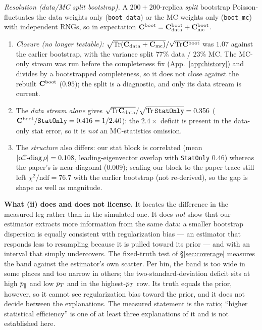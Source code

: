 \emph{Resolution (data/MC split bootstrap).} A $200{+}200$-replica \emph{split} bootstrap Poisson-fluctuates the data weights only (\texttt{boot\_data}) or the MC weights only (\texttt{boot\_mc}) with independent RNGs, so in expectation $\mathbf{C}^{\text{boot}}=\mathbf{C}^{\text{boot}}_{\mathrm{data}}+\mathbf{C}^{\text{boot}}_{\mathrm{mc}}$.
\begin{enumerate}[label=(\roman*),nosep]
\item \emph{Closure (no longer testable):} $\sqrt{\mathrm{Tr}(\mathbf{C}_{\mathrm{data}}+\mathbf{C}_{\mathrm{mc}})}/ \sqrt{\mathrm{Tr}\mathbf{C}^{\text{boot}}}$ was $1.07$ against the earlier bootstrap, with the variance split $77\%$ data / $23\%$ MC. The MC-only stream was run before the completeness fix (App.~\ref{app:history}) and divides by a bootstrapped completeness, so it does not close against the rebuilt $\mathbf{C}^{\text{boot}}$ ($0.95$); the split is a diagnostic, and only its data stream is current.
\item The \emph{data stream alone} gives $\sqrt{\mathrm{Tr}\mathbf{C}_{\mathrm{data}}}/\sqrt{\mathrm{Tr}\,\texttt{StatOnly}}=0.356$ ($\mathbf{C}^{\text{boot}}/\texttt{StatOnly}=0.416=1/2.40$): the $2.4\times$ deficit is present in the data-only stat error, so it is \emph{not} an MC-statistics omission.
\item The \emph{structure} also differs: our stat block is correlated (mean $|{\rm off\text{-}diag}\,\rho|=0.108$, leading-eigenvector overlap with \texttt{StatOnly} $0.46$) whereas the paper's is near-diagonal ($0.009$); scaling our block to the paper trace still left $\chi^{2}/\mathrm{ndf}=76.7$ with the earlier bootstrap (not re-derived), so the gap is shape as well as magnitude.
\end{enumerate}
\textbf{What (ii) does and does not license.} It locates the difference in the measured leg rather than in the simulated one. It does \emph{not} show that our estimator extracts more information from the same data: a smaller bootstrap dispersion is equally consistent with regularization bias --- an estimator that responds less to resampling because it is pulled toward its prior --- and with an interval that simply undercovers. The fixed-truth test of \S\ref{sec:coverage} measures the band against the estimator's own scatter. Per bin, the band is too wide in some places and too narrow in others; the two-standard-deviation deficit sits at high $p_{\parallel}$ and low $p_{T}$ and in the highest-$p_{T}$ row. Its truth equals the prior, however, so it cannot see regularization bias toward the prior, and it does not decide between the explanations. The measured statement is the ratio; ``higher statistical efficiency'' is one of at least three explanations of it and is not established here.

